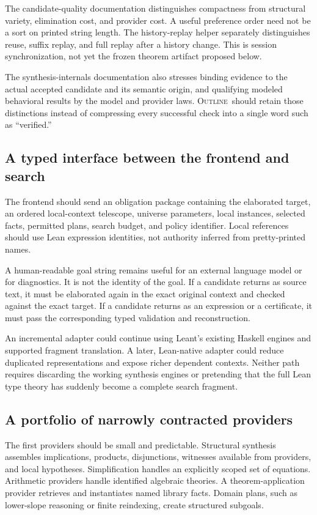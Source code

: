 \documentclass[11pt,a4paper]{article}
\newcommand{\Outline}{\textsc{Outline}}
\theoremstyle{definition}
\theoremstyle{remark}
\numberwithin{equation}{section}
\begin{document}
The candidate-quality documentation distinguishes compactness from structural variety, elimination cost, and provider cost. A useful preference order need not be a sort on printed string length.\cite{l-quality} The history-replay helper separately distinguishes reuse, suffix replay, and full replay after a history change. This is session synchronization, not yet the frozen theorem artifact proposed below.\cite{l-replay}

The synthesis-internals documentation also stresses binding evidence to the actual accepted candidate and its semantic origin, and qualifying modeled behavioral results by the model and provider laws. \Outline\ should retain those distinctions instead of compressing every successful check into a single word such as ``verified.''\cite{l-internals}

\subsection{A typed interface between the frontend and search}
The frontend should send an obligation package containing the elaborated target, an ordered local-context telescope, universe parameters, local instances, selected facts, permitted plans, search budget, and policy identifier. Local references should use Lean expression identities, not authority inferred from pretty-printed names.

A human-readable goal string remains useful for an external language model or for diagnostics. It is not the identity of the goal. If a candidate returns as source text, it must be elaborated again in the exact original context and checked against the exact target. If a candidate returns as an expression or a certificate, it must pass the corresponding typed validation and reconstruction.

An incremental adapter could continue using Leant's existing Haskell engines and supported fragment translation. A later, Lean-native adapter could reduce duplicated representations and expose richer dependent contexts. Neither path requires discarding the working synthesis engines or pretending that the full Lean type theory has suddenly become a complete search fragment.

\subsection{A portfolio of narrowly contracted providers}
The first providers should be small and predictable. Structural synthesis assembles implications, products, disjunctions, witnesses available from providers, and local hypotheses. Simplification handles an explicitly scoped set of equations. Arithmetic providers handle identified algebraic theories. A theorem-application provider retrieves and instantiates named library facts. Domain plans, such as lower-slope reasoning or finite reindexing, create structured subgoals.
\end{document}
